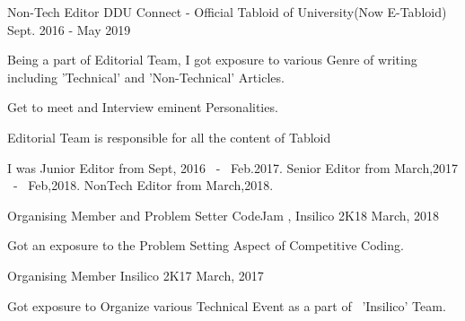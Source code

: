 


\begin{cventries}


\cventry
{Non-Tech Editor} %
{DDU Connect - Official Tabloid of University(Now E-Tabloid)} %
{Sept. 2016 - May 2019} %
{} %
{ %
\begin{cvitems}
\item {Being a part of Editorial Team, I got exposure to various Genre of writing including 'Technical' and 'Non-Technical' Articles.}
\item {Get to meet and Interview eminent Personalities.}
\item {Editorial Team is responsible for all the content of Tabloid}
\item {I was Junior Editor from Sept, 2016 ~-~ Feb.2017. Senior Editor from March,2017 ~-~ Feb,2018. NonTech Editor from March,2018.}
\end{cvitems}
}


\cventry
{Organising Member and Problem Setter} %
{CodeJam , Insilico 2K18} %
{March, 2018} %
{} %
{ %
\begin{cvitems}
\item {Got an exposure to the Problem Setting Aspect of Competitive Coding.}
\end{cvitems}
}


\cventry
{Organising Member} %
{Insilico 2K17} %
{March, 2017} %
{} %
{ %
\begin{cvitems}
\item {Got exposure to Organize various Technical Event as a part of ~'Insilico' Team.}
\end{cvitems}
}


\end{cventries}
